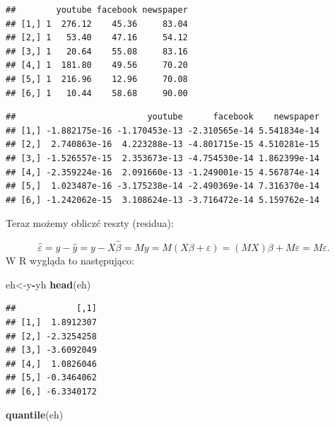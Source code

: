 \documentclass[]{article}
\newenvironment{Shaded}{\begin{snugshade}}{\end{snugshade}}
\newcommand{\KeywordTok}[1]{\textcolor[rgb]{0.13,0.29,0.53}{\textbf{#1}}}
\newcommand{\DecValTok}[1]{\textcolor[rgb]{0.00,0.00,0.81}{#1}}
\newcommand{\StringTok}[1]{\textcolor[rgb]{0.31,0.60,0.02}{#1}}
\newcommand{\OperatorTok}[1]{\textcolor[rgb]{0.81,0.36,0.00}{\textbf{#1}}}
\newcommand{\NormalTok}[1]{#1}
\begin{document}
\begin{verbatim}
##        youtube facebook newspaper
## [1,] 1  276.12    45.36     83.04
## [2,] 1   53.40    47.16     54.12
## [3,] 1   20.64    55.08     83.16
## [4,] 1  181.80    49.56     70.20
## [5,] 1  216.96    12.96     70.08
## [6,] 1   10.44    58.68     90.00
\end{verbatim}

\begin{Shaded}
\end{Shaded}

\begin{verbatim}
##                          youtube      facebook    newspaper
## [1,] -1.882175e-16 -1.170453e-13 -2.310565e-14 5.541834e-14
## [2,]  2.740863e-16  4.223288e-13 -4.801715e-15 4.510281e-15
## [3,] -1.526557e-15  2.353673e-13 -4.754530e-14 1.862399e-14
## [4,] -2.359224e-16  2.091660e-13 -1.249001e-15 4.567874e-14
## [5,]  1.023487e-16 -3.175238e-14 -2.490369e-14 7.316370e-14
## [6,] -1.242062e-15  3.108624e-13 -3.716472e-14 5.159762e-14
\end{verbatim}

Teraz możemy obliczć reszty (residua):

\[ \hat{\varepsilon} = y - \hat{y} = y - X\hat{\beta} = My = M(X\beta+\varepsilon) = (MX)\beta + M\varepsilon = M\varepsilon.\]
W R wygląda to następująco:

\begin{Shaded}
\begin{Highlighting}[]
\NormalTok{eh<-y}\OperatorTok{-}\NormalTok{yh}
\KeywordTok{head}\NormalTok{(eh)}
\end{Highlighting}
\end{Shaded}

\begin{verbatim}
##            [,1]
## [1,]  1.8912307
## [2,] -2.3254258
## [3,] -3.6092049
## [4,]  1.0826046
## [5,] -0.3464062
## [6,] -6.3340172
\end{verbatim}

\begin{Shaded}
\begin{Highlighting}[]
\KeywordTok{quantile}\NormalTok{(eh)}
\end{Highlighting}
\end{Shaded}
\end{document}
